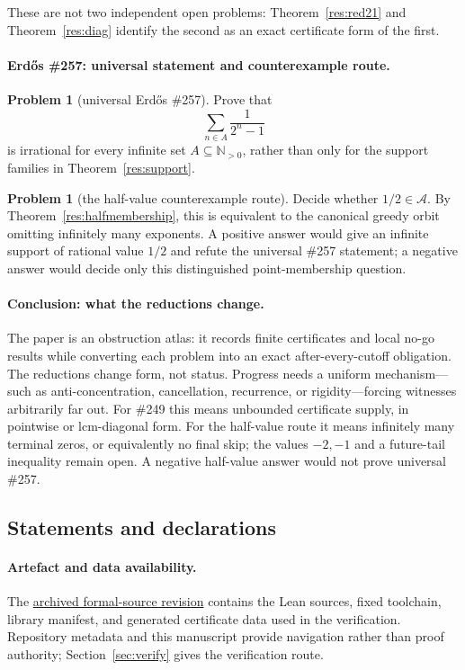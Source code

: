 \documentclass[11pt]{article}
\newcommand{\commit}{ebc98ee71f6819bd9fe344a0bb343542c604e533}
\newcommand{\sourceurl}{https://github.com/wcook04/plectis-lean-erdos249-257/tree/\commit}
\theoremstyle{definition}
\newtheorem{problem}[theorem]{Problem}
\theoremstyle{remark}
\newcommand{\Npos}{\mathbb{N}_{>0}}
\begin{document}
These are not two independent open problems: Theorem~\ref{res:red21} and
Theorem~\ref{res:diag} identify the second as an exact certificate form of
the first.

\paragraph{Erd\H{o}s \#257: universal statement and counterexample route.}
\begin{problem}[universal Erd\H{o}s \#257]
Prove that
\[
  \sum_{n\in A}\frac{1}{2^n-1}
\]
is irrational for every infinite set $A\subseteq\Npos$, rather than only for the
support families in Theorem~\ref{res:support}.
\end{problem}

\begin{problem}[the half-value counterexample route]
Decide whether $1/2\in\mathcal A$.  By
Theorem~\ref{res:halfmembership}, this is equivalent to the canonical greedy
orbit omitting infinitely many exponents.  A positive answer would give an
infinite support of rational value $1/2$ and refute the universal \#257
statement; a negative answer would decide only this distinguished
point-membership question.
\end{problem}

\paragraph{Conclusion: what the reductions change.}
The paper is an obstruction atlas: it records finite certificates and local
no-go results while converting each problem into an exact after-every-cutoff
obligation.  The reductions change form, not status.  Progress needs a uniform
mechanism---such as anti-concentration, cancellation, recurrence, or
rigidity---forcing witnesses arbitrarily far out.  For \#249 this means
unbounded certificate supply, in pointwise or lcm-diagonal form.  For the
half-value route it means infinitely many terminal zeros, or equivalently no
final skip; the values \(-2,-1\) and a future-tail inequality remain open.
A negative half-value answer would not prove universal \#257.

\subsection*{Statements and declarations}

\paragraph{Artefact and data availability.} The
\href{\sourceurl}{archived formal-source revision} contains the Lean sources,
fixed toolchain, library manifest, and generated certificate data used in the
verification. Repository metadata and this manuscript provide navigation
rather than proof authority; Section~\ref{sec:verify} gives the verification
route.
\end{document}
